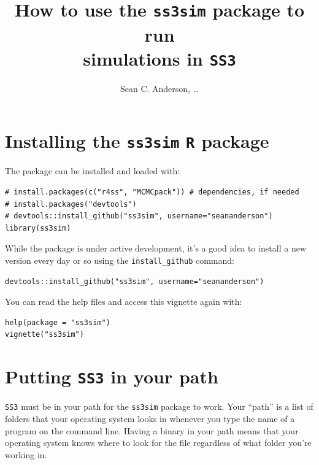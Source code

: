 \documentclass[12pt]{article}
\title{How to use the \texttt{ss3sim} package to run\\simulations in 
\texttt{SS3}}
\author{Sean C. Anderson, \ldots}
\date{}
\begin{document}
\maketitle

\section{Installing the \texttt{ss3sim} \texttt{R} package}

The package can be installed and loaded with:

\begin{verbatim}
# install.packages(c("r4ss", "MCMCpack")) # dependencies, if needed
# install.packages("devtools")
# devtools::install_github("ss3sim", username="seananderson")
library(ss3sim)
\end{verbatim}

\noindent
While the package is under active development, it's a good idea to install a 
new version every day or so using the \texttt{install\_github} command:

\begin{verbatim}
devtools::install_github("ss3sim", username="seananderson")
\end{verbatim}

\noindent
You can read the help files and access this vignette again with:

\begin{verbatim}
help(package = "ss3sim")
vignette("ss3sim")
\end{verbatim}

\noindent



\section{Putting \texttt{SS3} in your path}
\texttt{SS3} must be in your path for the \texttt{ss3sim} package to work. Your 
``path'' is a list of folders that your operating system looks in whenever you 
type the name of a program on the command line. Having a binary in your path 
means that your operating system knows where to look for the file regardless of 
what folder you're working in. 
\end{document}
